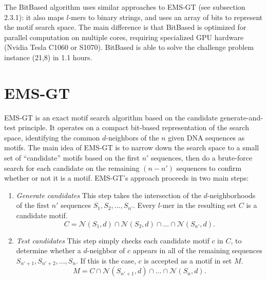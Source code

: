 \documentclass[oneside,12pt]{DISCSthesis}
\begin{document}
		The BitBased algorithm \cite{dasari2010efficient} uses similar approaches to EMS-GT (see subsection 2.3.1): it also maps $l$-mers to binary strings, and uses an array of bits to represent the motif search space. The main difference is that BitBased is optimized for parallel computation on multiple cores, requiring specialized GPU hardware (Nvidia Tesla C1060 or S1070). BitBased is able to solve the challenge problem instance (21,8) in 1.1 hours.

	\newpage
	\section{EMS-GT}
		EMS-GT \cite{nabos2015dissertation} is an exact motif search algorithm based on the candidate generate-and-test principle.
		It operates on a compact bit-based representation of the search space, identifying the common $d$-neighbors of the $n$ given DNA sequences as motifs. The main idea of EMS-GT is to narrow down the search space to a small set of ``candidate'' motifs based on the first $n'$ sequences, then do a brute-force search for each candidate on the remaining $(n - n')$ sequences to confirm whether or not it is a motif. 
		EMS-GT's approach proceeds in two main steps:
		\begin{enumerate} %
			\item {\em Generate candidates}\newline
			This step takes the intersection of the $d$-neighborhoods of the first $n'$ sequences $S_{1},S_{2},...,S_{n'}$. Every $l$-mer in the resulting set $C$ is a candidate motif.
				\begin{equation} C = \mathcal{N}(S_{1}, d) \cap \mathcal{N}(S_{2}, d) \cap...\cap \mathcal{N}(S_{n'}, d). \end{equation}
			\item {\em Test candidates}\newline
			This step simply checks each candidate motif $c$ in $C$, to determine whether a $d$-neighbor of $c$ appears in all of the remaining sequences $S_{n'+1},S_{n'+2},...,S_{n}$. If this is the case, $c$ is accepted as a motif in set $M$.
				\begin{equation} M = C \cap \mathcal{N}(S_{n'+1}, d) \cap...\cap \mathcal{N}(S_{n}, d). \end{equation}
			\end{enumerate}
\end{document}
